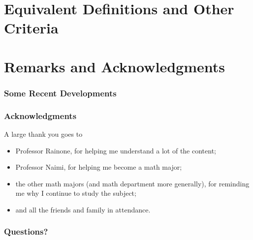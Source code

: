 \documentclass{beamer-custom}
\begin{document}
\section{Equivalent Definitions and Other Criteria}%
\section{Remarks and Acknowledgments}%
\begin{frame}
  \frametitle{Some Recent Developments}
\end{frame}
\begin{frame}
  \frametitle{Acknowledgments}
  A large thank you goes to
  \begin{itemize}
    \item Professor Rainone, for helping me understand a lot of the content;
    \item Professor Naimi, for helping me become a math major;
    \item the other math majors (and math department more generally), for reminding me why I continue to study the subject;
    \item and all the friends and family in attendance.
  \end{itemize}
\end{frame}
\begin{frame}
  \frametitle{Questions?}
\end{frame}
\end{document}
